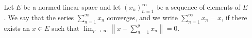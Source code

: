 Let $E$ be a normed linear space and let $(x_n)_{n=1}^{\infty}$ be a sequence of elements of $E$. We say that the series $\sum_{n=1}^{\infty} x_n$ converges, and we write $\sum_{n=1}^{\infty} x_n = x$, if there exists an $x \in E$ such that $\lim_{p \to \infty} \left\| x - \sum_{n=1}^{p} x_n \right\| = 0$.